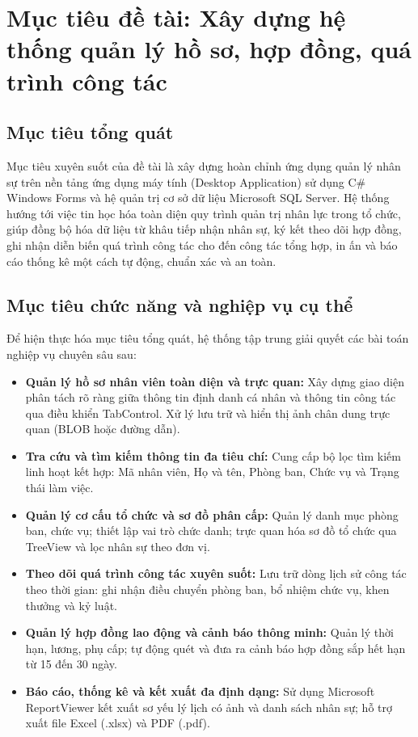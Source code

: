 \documentclass[12pt,a4paper]{report}
\begin{document}
\section{Mục tiêu đề tài: Xây dựng hệ thống quản lý hồ sơ, hợp đồng, quá trình công tác}

\subsection{Mục tiêu tổng quát}
Mục tiêu xuyên suốt của đề tài là xây dựng hoàn chỉnh ứng dụng quản lý nhân sự trên nền tảng ứng dụng máy tính (Desktop Application) sử dụng C\# Windows Forms và hệ quản trị cơ sở dữ liệu Microsoft SQL Server. Hệ thống hướng tới việc tin học hóa toàn diện quy trình quản trị nhân lực trong tổ chức, giúp đồng bộ hóa dữ liệu từ khâu tiếp nhận nhân sự, ký kết theo dõi hợp đồng, ghi nhận diễn biến quá trình công tác cho đến công tác tổng hợp, in ấn và báo cáo thống kê một cách tự động, chuẩn xác và an toàn.

\subsection{Mục tiêu chức năng và nghiệp vụ cụ thể}
Để hiện thực hóa mục tiêu tổng quát, hệ thống tập trung giải quyết các bài toán nghiệp vụ chuyên sâu sau:
\begin{itemize}[leftmargin=1.0cm]
    \item \textbf{Quản lý hồ sơ nhân viên toàn diện và trực quan:} Xây dựng giao diện phân tách rõ ràng giữa thông tin định danh cá nhân và thông tin công tác qua điều khiển TabControl. Xử lý lưu trữ và hiển thị ảnh chân dung trực quan (BLOB hoặc đường dẫn).
    \item \textbf{Tra cứu và tìm kiếm thông tin đa tiêu chí:} Cung cấp bộ lọc tìm kiếm linh hoạt kết hợp: Mã nhân viên, Họ và tên, Phòng ban, Chức vụ và Trạng thái làm việc.
    \item \textbf{Quản lý cơ cấu tổ chức và sơ đồ phân cấp:} Quản lý danh mục phòng ban, chức vụ; thiết lập vai trò chức danh; trực quan hóa sơ đồ tổ chức qua TreeView và lọc nhân sự theo đơn vị.
    \item \textbf{Theo dõi quá trình công tác xuyên suốt:} Lưu trữ dòng lịch sử công tác theo thời gian: ghi nhận điều chuyển phòng ban, bổ nhiệm chức vụ, khen thưởng và kỷ luật.
    \item \textbf{Quản lý hợp đồng lao động và cảnh báo thông minh:} Quản lý thời hạn, lương, phụ cấp; tự động quét và đưa ra cảnh báo hợp đồng sắp hết hạn từ 15 đến 30 ngày.
    \item \textbf{Báo cáo, thống kê và kết xuất đa định dạng:} Sử dụng Microsoft ReportViewer kết xuất sơ yếu lý lịch có ảnh và danh sách nhân sự; hỗ trợ xuất file Excel (.xlsx) và PDF (.pdf).
\end{itemize}
\end{document}
